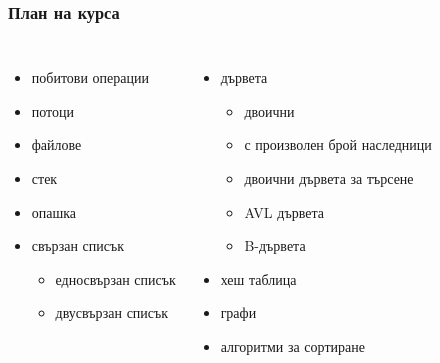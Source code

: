 \documentclass{beamer}
\begin{document}
\begin{frame}
  \frametitle{План на курса}

  \begin{columns}[t,onlytextwidth]

    \begin{itemize}
    \item побитови операции
    \item потоци
    \item файлове
    \item стек
    \item опашка
    \item свързан списък
      \begin{itemize}
      \item едносвързан списък
      \item двусвързан списък
      \end{itemize}
    \end{itemize}


    \begin{itemize}
    \item дървета
      \begin{itemize}
      \item двоични
      \item с произволен брой наследници
      \item двоични дървета за търсене
      \item AVL дървета
      \item B-дървета
      \end{itemize}
    \item хеш таблица
    \item графи
    \item алгоритми за сортиране
    \end{itemize}

  \end{columns}
\end{frame}
\end{document}
